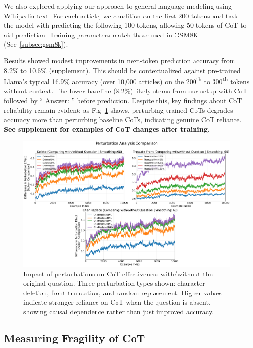 \documentclass{article}
\begin{document}
We also explored applying our approach to general language modeling using Wikipedia text. For each article, we condition on the first 200 tokens and task the model with predicting the following 100 tokens, allowing 50 tokens of CoT to aid prediction. Training parameters match those used in GSM8K (Sec~\ref{subsec:gsm8k}).

Results showed modest improvements in next-token prediction accuracy from 8.2\% to 10.5\% (supplement). This should be contextualized against pre-trained Llama's typical 16.9\% accuracy (over 10,000 articles) on the 200\textsuperscript{th} to 300\textsuperscript{th} tokens without context. The lower baseline (8.2\%) likely stems from our setup with CoT followed by `` Answer: '' before prediction. Despite this, key findings about CoT reliability remain evident: as Fig~\ref{fig:perturbation} shows, perturbing trained CoTs degrades accuracy more than perturbing baseline CoTs, indicating genuine CoT reliance.
\textbf{See supplement for examples of CoT changes after training.}

\begin{figure}[ht]
  \centering
  \includegraphics[width=\textwidth]{Figures/combined_perturbation_plot_comparison_question_centered.png}
  \caption{Impact of perturbations on CoT effectiveness with/without the original question. Three perturbation types shown: character deletion, front truncation, and random replacement. Higher values indicate stronger reliance on CoT when the question is absent, showing causal dependence rather than just improved accuracy.}
  \label{fig:perturbation}
\end{figure}


\subsection{Measuring Fragility of CoT}\label{subsec:fragile}
\end{document}
